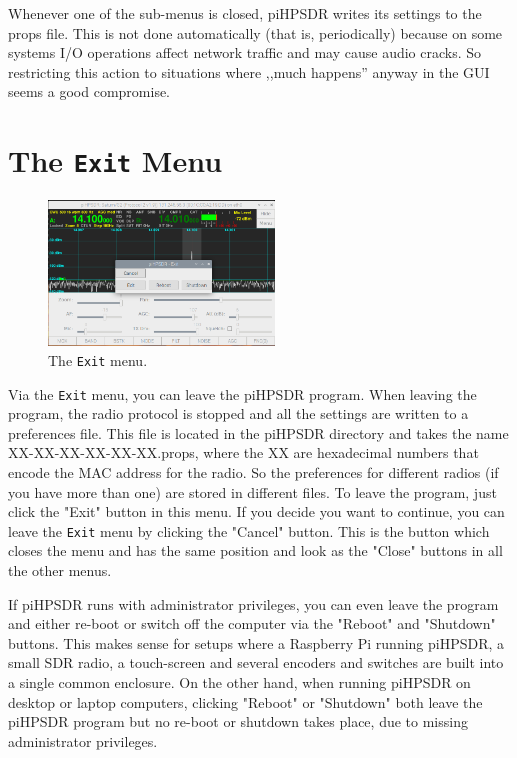 \documentclass[12pt]{book}
\def\bltt#1{\texttt{\color{blue}#1}}
\def\pH{pi\-HPSDR\xspace}
\begin{document}
Whenever one of the sub-menus is closed, piHPSDR writes its settings to the props file. This is not done
automatically (that is, periodically) because on some systems I/O operations affect
network traffic and may cause audio cracks. So restricting this action to situations
where ,,much happens'' anyway in the GUI seems a good compromise.
\section{The \texttt{Exit} Menu}

\begin{figure}[ht]
\center
\includegraphics[width=6cm]{ExitMenu.png}
\caption{The \bltt{Exit} menu.}
\end{figure}

Via the \bltt{Exit} menu, you can leave the \pH program. When leaving the program,
the radio protocol is stopped and all the settings are written to a preferences file. This
file is located in the \pH directory and takes the name XX-XX-XX-XX-XX-XX.props, where
the XX are hexadecimal numbers that encode the MAC address for the radio.
So the preferences for different radios (if you
have more than one) are stored in different files. To leave the program, just click the
"Exit" button in this menu. If you decide you want to continue, you can leave the \bltt{Exit}
menu by clicking the "Cancel" button. This is the button which closes the menu and has
the same position and look as the "Close" buttons in all the other menus.

If \pH runs with administrator privileges, you can even leave the program and either re-boot
or switch off the computer via the "Reboot" and "Shutdown" buttons. This makes sense for setups
where a Raspberry Pi running \pH, a small SDR radio, a touch-screen and several encoders
and switches are built into a single common enclosure. On the other hand, when running
\pH on desktop or laptop computers, clicking "Reboot" or "Shutdown" both leave the \pH
program but no re-boot or shutdown takes place, due to missing administrator privileges.
\end{document}
